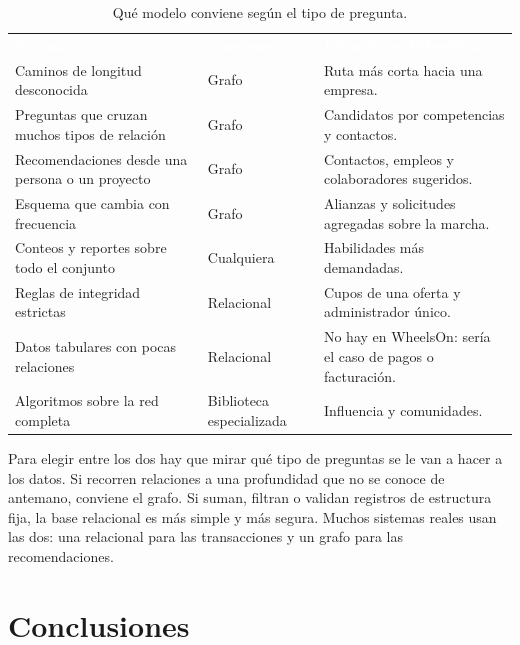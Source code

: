 \documentclass[11pt, a4paper]{article}
\newcommand{\cabecera}{\rowcolor{azul}}
\newcommand{\h}[1]{\textcolor{white}{\textbf{#1}}}
\begin{document}
\begin{table}[htbp]
\centering
\caption{Qué modelo conviene según el tipo de pregunta.}
\small
\begin{tabularx}{\linewidth}{@{}L l L@{}}
\cabecera \h{Escenario} & \h{Conviene} & \h{Ejemplo en WheelsOn} \\
Caminos de longitud desconocida                     & Grafo      & Ruta más corta hacia una empresa. \\
Preguntas que cruzan muchos tipos de relación       & Grafo      & Candidatos por competencias y contactos. \\
Recomendaciones desde una persona o un proyecto     & Grafo      & Contactos, empleos y colaboradores sugeridos. \\
Esquema que cambia con frecuencia                   & Grafo      & Alianzas y solicitudes agregadas sobre la marcha. \\
Conteos y reportes sobre todo el conjunto           & Cualquiera & Habilidades más demandadas. \\
Reglas de integridad estrictas                      & Relacional & Cupos de una oferta y administrador único. \\
Datos tabulares con pocas relaciones                & Relacional & No hay en WheelsOn: sería el caso de pagos o facturación. \\
Algoritmos sobre la red completa                    & Biblioteca especializada & Influencia y comunidades. \\
\bottomrule
\end{tabularx}
\end{table}

Para elegir entre los dos hay que mirar qué tipo de preguntas se le van a hacer a los
datos. Si recorren relaciones a una profundidad que no se conoce de antemano, conviene
el grafo. Si suman, filtran o validan registros de
estructura fija, la base relacional es más simple y más segura. Muchos sistemas reales
usan las dos: una relacional para las transacciones y un grafo para las
recomendaciones.

\section{Conclusiones}
\end{document}
